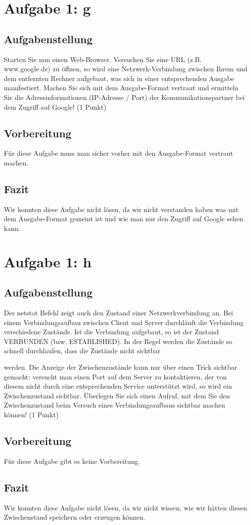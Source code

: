 \section{Aufgabe 1: g}

\subsection{Aufgabenstellung}
Starten Sie nun einen Web-Browser. Versuchen Sie eine URL (z.B. www.google.de) zu
öffnen, so wird eine Netzwerk-Verbindung zwischen Ihrem und dem entfernten Rechner
aufgebaut, was sich in einer entsprechenden Ausgabe manifestiert. Machen Sie sich mit
dem Ausgabe-Format vertraut und ermitteln Sie die Adressinformationen (IP-Adresse /
Port) der Kommunikationspartner bei dem Zugriff auf Google! (1 Punkt)

\subsection{Vorbereitung}
Für diese Aufgabe muss man sicher vorher mit den Ausgabe-Format vertraut machen.

\subsection{Fazit}
Wir konnten diese Aufgabe nicht lösen, da wir nicht verstanden haben was mit dem Ausgabe-Format gemeint ist und wie man nur den Zugriff auf Google sehen kann.

\section{Aufgabe 1: h}

\subsection{Aufgabenstellung}
Der netstat Befehl zeigt auch den Zustand einer Netzwerkverbindung an. Bei einem
Verbindungsaufbau zwischen Client und Server durchläuft die Verbindung verschiedene
Zustände. Ist die Verbindung aufgebaut, so ist der Zustand VERBUNDEN (bzw. ESTABLISHED).
In der Regel werden die Zustände so schnell durchlaufen, dass die Zustände nicht sichtbar

werden. Die Anzeige der Zwischenzustände kann nur über einen Trick sichtbar gemacht:
versucht man einen Port auf dem Server zu kontaktieren, der von diesem nicht durch eine
entsprechenden Service unterstützt wird, so wird ein Zwischenzustand sichtbar. Überlegen
Sie sich einen Aufruf, mit dem Sie den Zwischenzustand beim Versuch eines Verbindungsaufbaus sichtbar machen können! (1 Punkt)

\subsection{Vorbereitung}
Für diese Aufgabe gibt es keine Vorbereitung.

\subsection{Fazit}
Wir konnten diese Aufgabe nicht lösen, da wir nicht wissen, wie wir hätten diesen Zwischenstand speichern oder erzeugen können.

